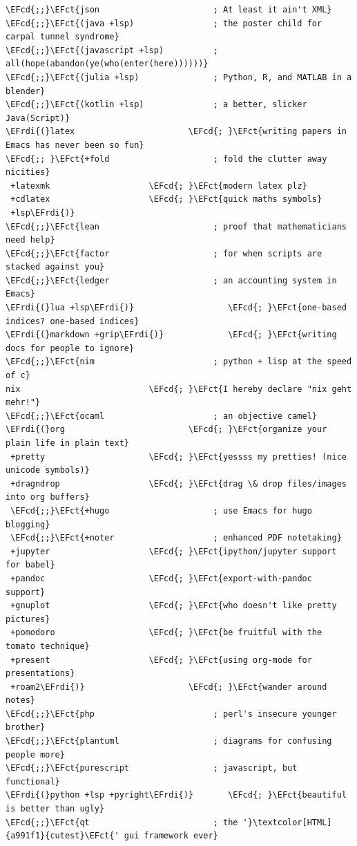 \documentclass{scrartcl}
\newcommand{\EFct}[1]{\textcolor{EFct}{#1}} %
\newcommand{\EFcd}[1]{\textcolor{EFcd}{#1}} %
\newcommand{\EFrdi}[1]{#1} %
\begin{document}
\begin{enumerate}
\begin{Code}
\begin{Verbatim}[]
\EFcd{;;}\EFct{json                       ; At least it ain't XML}
\EFcd{;;}\EFct{(java +lsp)                ; the poster child for carpal tunnel syndrome}
\EFcd{;;}\EFct{(javascript +lsp)          ; all(hope(abandon(ye(who(enter(here))))))}
\EFcd{;;}\EFct{(julia +lsp)               ; Python, R, and MATLAB in a blender}
\EFcd{;;}\EFct{(kotlin +lsp)              ; a better, slicker Java(Script)}
\EFrdi{(}latex                       \EFcd{; }\EFct{writing papers in Emacs has never been so fun}
\EFcd{;; }\EFct{+fold                     ; fold the clutter away nicities}
 +latexmk                    \EFcd{; }\EFct{modern latex plz}
 +cdlatex                    \EFcd{; }\EFct{quick maths symbols}
 +lsp\EFrdi{)}
\EFcd{;;}\EFct{lean                       ; proof that mathematicians need help}
\EFcd{;;}\EFct{factor                     ; for when scripts are stacked against you}
\EFcd{;;}\EFct{ledger                     ; an accounting system in Emacs}
\EFrdi{(}lua +lsp\EFrdi{)}                   \EFcd{; }\EFct{one-based indices? one-based indices}
\EFrdi{(}markdown +grip\EFrdi{)}             \EFcd{; }\EFct{writing docs for people to ignore}
\EFcd{;;}\EFct{nim                        ; python + lisp at the speed of c}
nix                          \EFcd{; }\EFct{I hereby declare "nix geht mehr!"}
\EFcd{;;}\EFct{ocaml                      ; an objective camel}
\EFrdi{(}org                         \EFcd{; }\EFct{organize your plain life in plain text}
 +pretty                     \EFcd{; }\EFct{yessss my pretties! (nice unicode symbols)}
 +dragndrop                  \EFcd{; }\EFct{drag \& drop files/images into org buffers}
 \EFcd{;;}\EFct{+hugo                     ; use Emacs for hugo blogging}
 \EFcd{;;}\EFct{+noter                    ; enhanced PDF notetaking}
 +jupyter                    \EFcd{; }\EFct{ipython/jupyter support for babel}
 +pandoc                     \EFcd{; }\EFct{export-with-pandoc support}
 +gnuplot                    \EFcd{; }\EFct{who doesn't like pretty pictures}
 +pomodoro                   \EFcd{; }\EFct{be fruitful with the tomato technique}
 +present                    \EFcd{; }\EFct{using org-mode for presentations}
 +roam2\EFrdi{)}                     \EFcd{; }\EFct{wander around notes}
\EFcd{;;}\EFct{php                        ; perl's insecure younger brother}
\EFcd{;;}\EFct{plantuml                   ; diagrams for confusing people more}
\EFcd{;;}\EFct{purescript                 ; javascript, but functional}
\EFrdi{(}python +lsp +pyright\EFrdi{)}       \EFcd{; }\EFct{beautiful is better than ugly}
\EFcd{;;}\EFct{qt                         ; the '}\textcolor[HTML]{a991f1}{cutest}\EFct{' gui framework ever}

\end{Verbatim}
\end{Code}
\end{enumerate}
\end{document}
